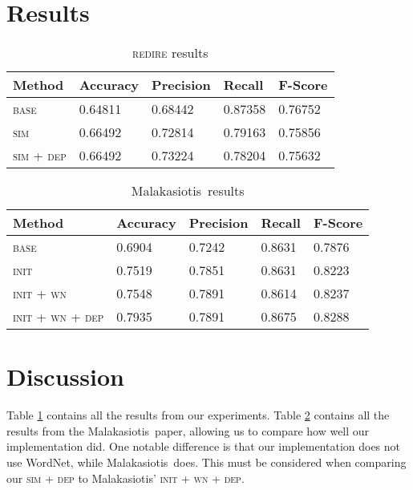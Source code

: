 \documentclass[11pt, reqno]{amsart}
\newcommand{\mala}{Malakasiotis}
\begin{document}
	\section{Results}
	
	\begin{table}[H]
	\centering	
	\begin{tabular}{|l||l||l|l|l|}
	\hline
	\textbf{Method} & \textbf{Accuracy} & \textbf{Precision} & \textbf{Recall} & \textbf{F-Score} \\ \hline
	\textsc{base} & 0.64811 & 0.68442 & 0.87358 & 0.76752 \\ \hline
	\textsc{sim} & 0.66492 & 0.72814 & 0.79163 & 0.75856 \\ \hline
	\textsc{sim} + \textsc{dep} & 0.66492 & 0.73224 & 0.78204 & 0.75632 \\ \hline
	\end{tabular}
	\caption{\textsc{redire} results}\label{tab:result}
	\end{table}
	
	\begin{table}[H]
	\centering
	\begin{tabular}{|l||l||l|l|l|}
	\hline
	\textbf{Method} & \textbf{Accuracy} & \textbf{Precision} & \textbf{Recall} & \textbf{F-Score} \\ \hline
	\textsc{base} & 0.6904 & 0.7242 & 0.8631 & 0.7876 \\ \hline
	\textsc{init} & 0.7519 & 0.7851 & 0.8631 & 0.8223 \\ \hline
	\textsc{init} + \textsc{wn} & 0.7548 & 0.7891 & 0.8614 & 0.8237 \\ \hline
	\textsc{init} + \textsc{wn} + \textsc{dep} & 0.7935 & 0.7891 & 0.8675 & 0.8288 \\ \hline
	\end{tabular}
	\caption{\mala~results \cite{malakasiotis2009paraphrase}}\label{tab:malak}
	\end{table}
	
	\section{Discussion}
	Table \ref{tab:result} contains all the results from our experiments. Table \ref{tab:malak} contains all the results from the \mala~paper, allowing us to compare how well our implementation did. One notable difference is that our implementation does not use WordNet, while \mala~does. This must be considered when comparing our \textsc{sim + dep} to \mala' \textsc{init + wn + dep}. 
	
\end{document}
